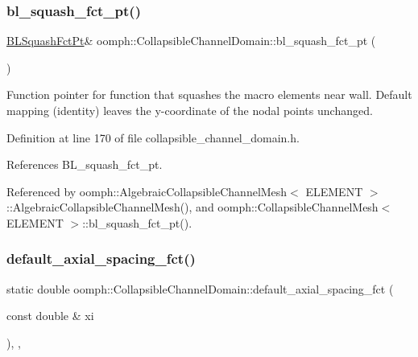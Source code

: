 \mbox{\label{classoomph_1_1CollapsibleChannelDomain_a9c7def97a2248a8e5a2dca79ee3a54eb}} 
\subsubsection{\texorpdfstring{bl\+\_\+squash\+\_\+fct\+\_\+pt()}{bl\_squash\_fct\_pt()}}
{\footnotesize\ttfamily \hyperlink{classoomph_1_1CollapsibleChannelDomain_a2bf1d7943bfac134a5c27a54c7e1faed}{B\+L\+Squash\+Fct\+Pt}\& oomph\+::\+Collapsible\+Channel\+Domain\+::bl\+\_\+squash\+\_\+fct\+\_\+pt (\begin{DoxyParamCaption}{ }\end{DoxyParamCaption})\hspace{0.3cm}{\ttfamily [inline]}}



Function pointer for function that squashes the macro elements near wall. Default mapping (identity) leaves the y-\/coordinate of the nodal points unchanged. 



Definition at line 170 of file collapsible\+\_\+channel\+\_\+domain.\+h.



References B\+L\+\_\+squash\+\_\+fct\+\_\+pt.



Referenced by oomph\+::\+Algebraic\+Collapsible\+Channel\+Mesh$<$ E\+L\+E\+M\+E\+N\+T $>$\+::\+Algebraic\+Collapsible\+Channel\+Mesh(), and oomph\+::\+Collapsible\+Channel\+Mesh$<$ E\+L\+E\+M\+E\+N\+T $>$\+::bl\+\_\+squash\+\_\+fct\+\_\+pt().

\mbox{\label{classoomph_1_1CollapsibleChannelDomain_a3c814ed3312790877d193d4a018c30da}} 
\subsubsection{\texorpdfstring{default\+\_\+axial\+\_\+spacing\+\_\+fct()}{default\_axial\_spacing\_fct()}}
{\footnotesize\ttfamily static double oomph\+::\+Collapsible\+Channel\+Domain\+::default\+\_\+axial\+\_\+spacing\+\_\+fct (\begin{DoxyParamCaption}\item[{const double \&}]{xi }\end{DoxyParamCaption})\hspace{0.3cm}{\ttfamily [inline]}, {\ttfamily [static]}, {\ttfamily [private]}}



